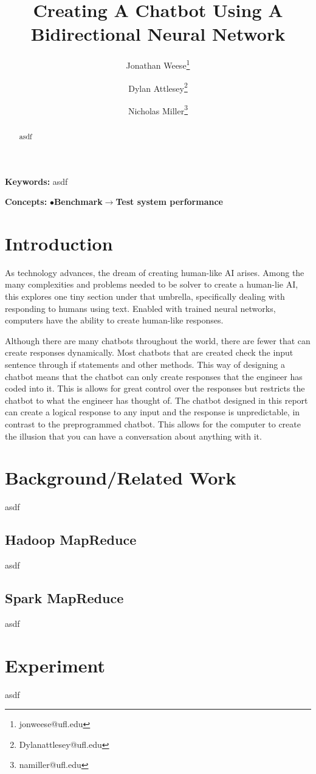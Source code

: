 \documentclass[11pt,twocolumn]{article}
\title{\textbf{Creating A Chatbot Using A Bidirectional Neural Network}}
\author{Jonathan Weese\thanks{jonweese@ufl.edu} \and Dylan Attlesey\thanks{Dylanattlesey@ufl.edu} \and Nicholas Miller\thanks{namiller@ufl.edu}}
\providecommand{\keywords}[1]
{
  \textbf{Keywords:} #1
}
\providecommand{\concepts}[1]
{
  \textbf{Concepts:} #1
}
\begin{document}
\maketitle

\begin{abstract}
asdf
\end{abstract}

\keywords{asdf}

\concepts{$\bullet$\textbf{Benchmark}$\rightarrow$\textbf{Test system performance}}


\section{Introduction}
As technology advances, the dream of creating human-like AI arises.  Among the many complexities and problems needed to be solver to create a human-lie AI, this explores one tiny section under that umbrella, specifically dealing with responding to humans using text.  Enabled with trained neural networks, computers have the ability to create human-like responses.

Although there are many chatbots throughout the world, there are fewer that can create responses dynamically.  Most chatbots that are created check the input sentence through if statements and other methods.  This way of designing a chatbot means that the chatbot can only create responses that the engineer has coded into it.  This is allows for great control over the responses but restricts the chatbot to what the engineer has thought of.  The chatbot designed in this report can create a logical response to any input and the response is unpredictable, in contrast to the preprogrammed chatbot.  This allows for the computer to create the illusion that you can have a conversation about anything with it.
\section{Background/Related Work}
asdf
\subsection*{Hadoop MapReduce}
asdf
\subsection*{Spark MapReduce}
asdf
\section{Experiment}
asdf
\end{document}
